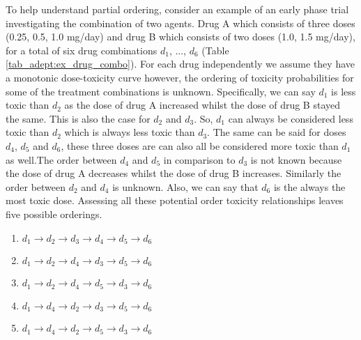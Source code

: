To help understand partial ordering, consider an example of an early phase trial investigating the combination of two agents. Drug A which consists of three doses (0.25, 0.5, 1.0 mg/day) and drug B which consists of two doses (1.0, 1.5 mg/day), for a total of six drug combinations $d_{1}$, ..., $d_{6}$ (Table \ref{tab_adept:ex_drug_combo}). For each drug independently we assume they have a monotonic dose-toxicity curve however, the ordering of toxicity probabilities for some of the treatment combinations is unknown. Specifically, we can say $d_{1}$ is less toxic than $d_{2}$ as the dose of drug A increased whilst the dose of drug B stayed the same. This is also the case for $d_{2}$ and $d_{3}$. So, $d_{1}$ can always be considered less toxic than $d_{2}$ which is always less toxic than $d_{3}$. The same can be said for doses $d_{4}$, $d_{5}$ and $d_{6}$, these three doses are can also all be considered more toxic than $d_{1}$ as well.The order between $d_{4}$ and $d_{5}$ in comparison to $d_{3}$ is not known because the dose of drug A decreases whilst the dose of drug B increases. Similarly the order between $d_{2}$ and $d_{4}$ is unknown. Also, we can say that $d_{6}$ is the always the most toxic dose. Assessing all these potential order toxicity relationships leaves five possible orderings. 

\begin{enumerate}
	\centering
	\item $d_{1} \rightarrow d_{2} \rightarrow d_{3} \rightarrow d_{4} \rightarrow d_{5} \rightarrow d_{6}$
	\item $d_{1} \rightarrow d_{2} \rightarrow d_{4} \rightarrow d_{3} \rightarrow d_{5} \rightarrow d_{6}$
	\item $d_{1} \rightarrow d_{2} \rightarrow d_{4} \rightarrow d_{5} \rightarrow d_{3} \rightarrow d_{6}$
	\item $d_{1} \rightarrow d_{4} \rightarrow d_{2} \rightarrow d_{3} \rightarrow d_{5} \rightarrow d_{6}$
	\item $d_{1} \rightarrow d_{4} \rightarrow d_{2} \rightarrow d_{5} \rightarrow d_{3} \rightarrow d_{6}$
\end{enumerate}


